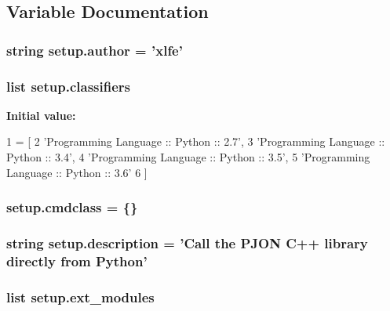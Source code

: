 \subsection{Variable Documentation}
\hypertarget{namespacesetup_ac83393287a89728d636e4ae9f4ac914f}{
\subsubsection[{author}]{\setlength{\rightskip}{0pt plus 5cm}string setup.\-author = 'xlfe'}}\label{namespacesetup_ac83393287a89728d636e4ae9f4ac914f}
\hypertarget{namespacesetup_a2d96dddd66b7833bbb2db38dbbe55a02}{
\subsubsection[{classifiers}]{\setlength{\rightskip}{0pt plus 5cm}list setup.\-classifiers}}\label{namespacesetup_a2d96dddd66b7833bbb2db38dbbe55a02}
{\bfseries Initial value\-:}
\begin{DoxyCode}
1 = [
2         \textcolor{stringliteral}{'Programming Language :: Python :: 2.7'},
3         \textcolor{stringliteral}{'Programming Language :: Python :: 3.4'},
4         \textcolor{stringliteral}{'Programming Language :: Python :: 3.5'},
5         \textcolor{stringliteral}{'Programming Language :: Python :: 3.6'}
6     ]
\end{DoxyCode}
\hypertarget{namespacesetup_aa128e9ba397a7b5b03bb964c4d14268d}{
\subsubsection[{cmdclass}]{\setlength{\rightskip}{0pt plus 5cm}setup.\-cmdclass = \{\}}}\label{namespacesetup_aa128e9ba397a7b5b03bb964c4d14268d}
\hypertarget{namespacesetup_ade8aa54df2083113a10326ea2fe7934b}{
\subsubsection[{description}]{\setlength{\rightskip}{0pt plus 5cm}string setup.\-description = 'Call the P\-J\-O\-N {\bf C}++ library directly from Python'}}\label{namespacesetup_ade8aa54df2083113a10326ea2fe7934b}
\hypertarget{namespacesetup_a657516be9ed3c70ce05f5f6918206934}{
\subsubsection[{ext\-\_\-modules}]{\setlength{\rightskip}{0pt plus 5cm}list setup.\-ext\-\_\-modules}}\label{namespacesetup_a657516be9ed3c70ce05f5f6918206934}
